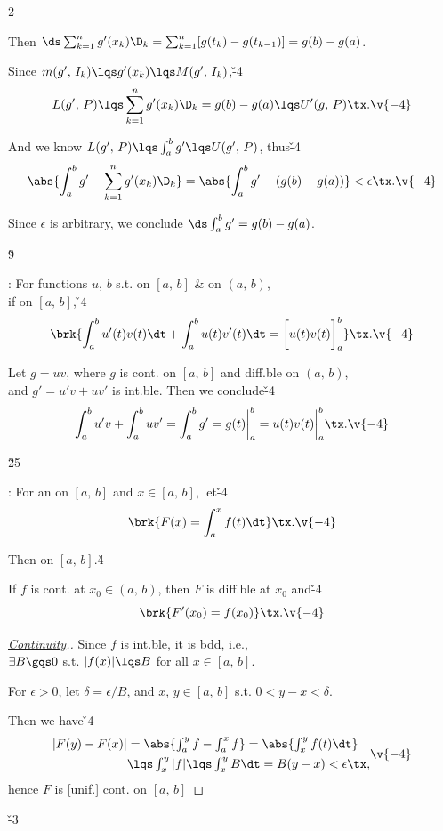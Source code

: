 \documentclass[dvipdfmx,a4paper,titlepage,9pt]{jsarticle}
\begin{document}
\begin{multicols*}{2}
\begin{Pfbox}
Then $\ds\sum_{k=1}^ng'(x_k)\D_k=\sum_{k=1}^n[g(t_k)-g(t_{k-1})]=g(b)-g(a)$.

Since $m(g',\,I_k)\lqs g'(x_k)\lqs M(g',\,I_k)$,\v{-4}
$$L(g',\,P)\lqs\sum_{k=1}^ng'(x_k)\D_k=g(b)-g(a)\lqs U'(g,\,P)\tx.\v{-4}$$

And we know $L(g',\,P)\lqs\int_a^bg'\lqs U(g',\,P)$, thus\v{-4}
$$\abs{\int_a^bg'-\sum_{k=1}^ng'(x_k)\D_k}=\abs{\int_a^bg'-(g(b)-g(a))}<\epsilon\tx.\v{-4}$$

Since $\epsilon$ is arbitrary, we conclude $\ds\int_a^bg'=g(b)-g(a)$.
\end{Pfbox}\v9


: For functions $u$, $b$ s.t.  on $[a,\,b]$ \&  on $(a,\,b)$,\\
\quad\;\;if  on $[a,\,b]$,\v{-4}
$$\brk{\int_a^bu'(t)v(t)\dt+\int_a^bu(t)v'(t)\dt=\bigg[u(t)v(t)\bigg]^b_a}\tx.\v{-4}$$

\begin{Pfbox}
Let $g=uv$, where $g$ is cont. on $[a,\,b]$ and diff.ble on $(a,\,b)$,\\
and $g'=u'v+uv'$ is int.ble. Then we conclude\v{-4}
$$\int_a^bu'v+\int_a^buv'=\int_a^bg'=g(t)\bigg|_a^b=u(t)v(t)\bigg|^b_a\tx.\v{-4}$$
\end{Pfbox}\v{25}


: For an  on $[a,\,b]$ and $x\in[a,\,b]$, let\v{-4}
$$\brk{F(x)=\int_a^xf(t)\dt}\tx.\v{-4}$$

\;\;Then  on $[a,\,b]$.\v4

\;\;If $f$ is cont. at $x_0\in(a,\,b)$, then $F$ is diff.ble at $x_0$ and\v{-4}
$$\brk{F'(x_0)=f(x_0)}\tx.\v{-4}$$

\vfill\null\columnbreak


\begin{pfbox}\footnotesize
\begin{proof}[\color{TGreen}\ul{Continuity}.]\rnc{\qedsymbol}{\Sq}Since $f$ is int.ble, it is bdd, i.e.,\\
$\exists B\gqs 0$ s.t. $|f(x)|\lqs B$ for all $x\in[a,\,b]$.

For $\epsilon>0$, let $\delta=\epsilon/B$, and $x$, $y\in[a,\,b]$ s.t. $0<y-x<\delta$.

Then we have\v{-4}
$$\begin{aligned}
|F(y)-F(x)|&=\textstyle\abs{\int_a^yf-\int_a^xf}=\abs{\int_x^yf(t)\dt}\\
&\textstyle\lqs\int_x^y|f|\lqs\int_x^y B\dt=B(y-x)<\epsilon\tx,
\end{aligned}\v{-4}$$
hence $F$ is [unif.] cont. on $[a,\,b]$
\end{proof}\v{-3}


\end{pfbox}
\end{multicols*}
\end{document}
